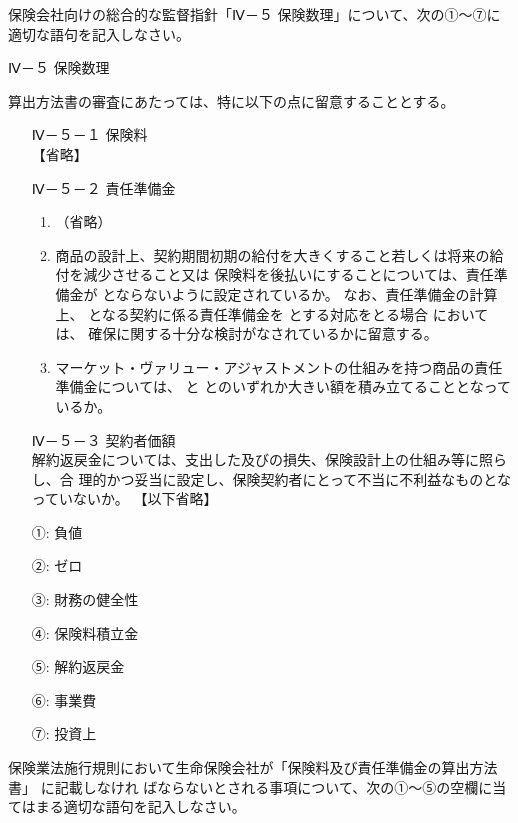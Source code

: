 \documentclass[report,gutter=10mm,fore-edge=10mm,uplatex,dvipdfmx]{jlreq}
\begin{document}
保険会社向けの総合的な監督指針「Ⅳ－５ 保険数理」について、次の①～⑦に適切な語句を記入しなさい。

\noindent{} Ⅳ－５ 保険数理

算出方法書の審査にあたっては、特に以下の点に留意することとする。
\begin{itemize}
 \item [] Ⅳ－５－１ 保険料\\
【省略】
 \item [] Ⅳ－５－２ 責任準備金
\begin{enumerate}[(1)]
\item  （省略）
\item 商品の設計上、契約期間初期の給付を大きくすること若しくは将来の給付を減少させること又は
 保険料を後払いにすることについては、責任準備金が  とならないように設定されているか。
 なお、責任準備金の計算上、  となる契約に係る責任準備金を  とする対応をとる場合
 においては、  確保に関する十分な検討がなされているかに留意する。
\item マーケット・ヴァリュー・アジャストメントの仕組みを持つ商品の責任準備金については、
 と  とのいずれか大きい額を積み立てることとなっているか。
\end{enumerate} 
\item [] Ⅳ－５－３ 契約者価額\\
解約返戻金については、支出した及びの損失、保険設計上の仕組み等に照らし、合
理的かつ妥当に設定し、保険契約者にとって不当に不利益なものとなっていないか。
【以下省略】
\end{itemize}

\answer{}
\begin{itemize}
\item[ ①:]  負値
\item[ ②:]  ゼロ
\item[ ③:]  財務の健全性
\item[ ④:]  保険料積立金
\item[ ⑤:]  解約返戻金
\item[ ⑥:]  事業費
\item[ ⑦:]  投資上
\end{itemize}

保険業法施行規則において生命保険会社が「保険料及び責任準備金の算出方法書」 に記載しなけれ
ばならないとされる事項について、次の①～⑤の空欄に当てはまる適切な語句を記入しなさい。
\end{document}
